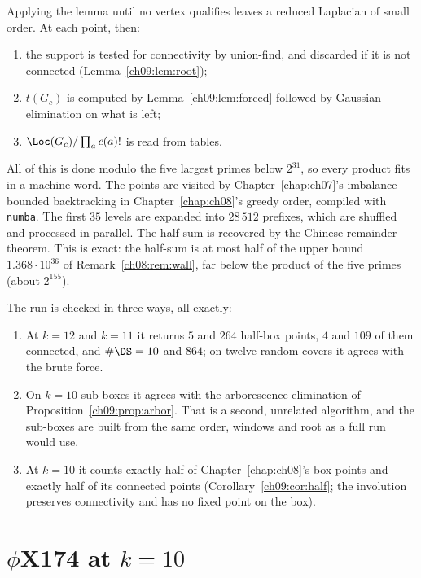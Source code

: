 Applying the lemma until no vertex qualifies leaves a reduced Laplacian of small order. At each
point, then:
\begin{enumerate}
\item the support is tested for connectivity by union-find, and discarded if it is not
connected (Lemma~\ref{ch09:lem:root});
\item $t(G_c)$ is computed by Lemma~\ref{ch09:lem:forced} followed by Gaussian elimination on
what is left;
\item $\Loc(G_c)/\prod_a c(a)!$ is read from tables.
\end{enumerate}
All of this is done modulo the five largest primes below $2^{31}$, so every product fits in a
machine word. The points are visited by Chapter~\ref{chap:ch07}'s imbalance-bounded backtracking in Chapter~\ref{chap:ch08}'s
greedy order, compiled with \texttt{numba}. The first $35$ levels are expanded into $28\,512$
prefixes, which are shuffled and processed in parallel. The half-sum is recovered by the
Chinese remainder theorem. This is exact: the half-sum is at most half of the upper bound
$1.368\cdot10^{36}$ of Remark~\ref{ch08:rem:wall}, far below the product of the five primes (about $2^{155}$).

The run is checked in three ways, all exactly:
\begin{enumerate}
\item At $k=12$ and $k=11$ it returns $5$ and $264$ half-box points, $4$ and $109$ of them
connected, and $\#\DS=10$ and $864$; on twelve random covers it agrees with the brute force.
\item On $k=10$ sub-boxes it agrees with the arborescence elimination of
Proposition~\ref{ch09:prop:arbor}. That is a second, unrelated algorithm, and the sub-boxes are
built from the same order, windows and root as a full run would use.
\item At $k=10$ it counts exactly half of Chapter~\ref{chap:ch08}'s box points and exactly half of its
connected points (Corollary~\ref{ch09:cor:half}; the involution preserves connectivity and has no
fixed point on the box).
\end{enumerate}

\section{\texorpdfstring{$\phi$X174 at $k=10$}{phiX174 at k=10}}\label{ch09:sec:result}

